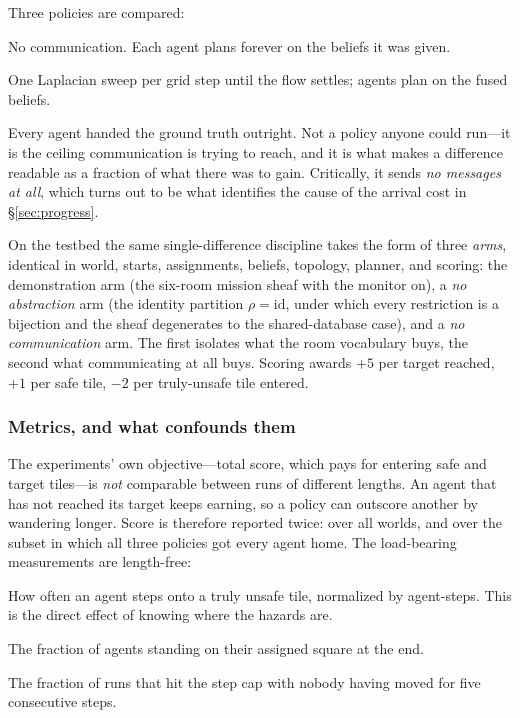 \documentclass[11pt]{article}
\theoremstyle{definition}
\theoremstyle{remark}
\begin{document}
Three policies are compared:
\begin{description}[leftmargin=1.8em,style=nextline,nosep]
\item[isolated] No communication. Each agent plans forever on the beliefs it was given.
\item[sheaf] One Laplacian sweep per grid step until the flow settles; agents plan on the fused
  beliefs.
\item[omniscient] Every agent handed the ground truth outright.
  Not a policy anyone could run---it is the ceiling communication is trying to reach, and it is
  what makes a difference readable as a fraction of what there was to gain.
  Critically, it sends \emph{no messages at all}, which turns out to be what identifies the
  cause of the arrival cost in \S\ref{sec:progress}.
\end{description}

On the testbed the same single-difference discipline takes the form of three \emph{arms},
identical in world, starts, assignments, beliefs, topology, planner, and scoring: the
demonstration arm (the six-room mission sheaf with the monitor on), a \emph{no abstraction} arm
(the identity partition $\rho = \mathrm{id}$, under which every restriction is a bijection and
the sheaf degenerates to the shared-database case), and a \emph{no communication} arm.
The first isolates what the room vocabulary buys, the second what communicating at all buys.
Scoring awards $+5$ per target reached, $+1$ per safe tile, $-2$ per truly-unsafe tile entered.

\subsubsection{Metrics, and what confounds them}
\label{sec:metrics}

The experiments' own objective---total score, which pays for entering safe and target
tiles---is \emph{not} comparable between runs of different lengths.
An agent that has not reached its target keeps earning, so a policy can outscore another by
wandering longer.
Score is therefore reported twice: over all worlds, and over the subset in which all three
policies got every agent home.
The load-bearing measurements are length-free:

\begin{description}[leftmargin=1.8em,style=nextline,nosep]
\item[unsafe per agent-step] How often an agent steps onto a truly unsafe tile, normalized by
  agent-steps. This is the direct effect of knowing where the hazards are.
\item[agents arrived] The fraction of agents standing on their assigned square at the end.
\item[deadlock rate] The fraction of runs that hit the step cap with nobody having moved for
  five consecutive steps.
\end{description}
\end{document}

